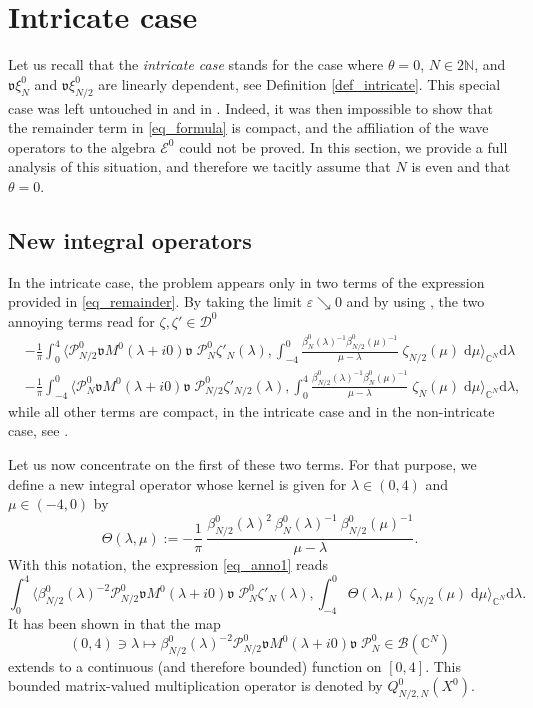 \documentclass[11pt]{article}
\def\B{\mathscr B}
\def\C{\mathbb C}
\def\d{\mathrm d}
\def\Drond{\mathscr D}
\def\EE{\mathscr E}
\def\N{\mathbb N}
\def\P{\mathcal P}
\def\v{\mathfrak v}
\begin{document}
\section{Intricate case}\label{sec_Degenerate}
\setcounter{equation}{0}
Let us recall that the \emph{intricate case} stands for the case where $\theta=0$,
$N\in2\N$, and $\v\xi_N^0$ and $\v\xi^0_{N/2}$ are linearly dependent, 
see Definition \ref{def_intricate}.
This special case was left untouched in \cite{NRT} and in \cite{APRR}.
Indeed, it was then impossible to show that the remainder term in \eqref{eq_formula}
is compact, and the affiliation of the wave operators to the algebra $\EE^0$
could not be proved.
In this section, we provide a full analysis of this situation, and therefore we tacitly assume
that $N$ is even and that $\theta=0$.

\subsection{New integral operators}\label{sec_extra_t}

In the intricate case, the problem appears only in two terms of the expression provided in \eqref{eq_remainder}. By taking the limit $\varepsilon\searrow 0$ and by using \cite[Lem.~4.1]{NRT}, the two annoying terms read for $\zeta,\zeta'\in\Drond^0$
\begin{align}
\label{eq_anno1} & -\frac{1}{\pi}\int_0^4\bigg\langle
\P_{N/2}^0\v M^0(\lambda+i0)\v\;\!\P_{N}^0
\zeta'_{N}(\lambda),\int_{-4}^0\frac{
\beta_{N}^0(\lambda)^{-1}\beta_{N/2}^0(\mu)^{-1}}{\mu-\lambda}\;\!\zeta_{N/2}(\mu)
\;\!\d\mu\bigg\rangle_{\C^N}\d\lambda \\
\label{eq_anno2} & - \frac{1}{\pi}
\int_{-4}^0\bigg\langle
\P_N^0\v M^0(\lambda+i0)\v\;\!\P_{N/2}^0
\zeta'_{N/2}(\lambda),\int_{0}^4\frac{
\beta_{N/2}^0(\lambda)^{-1}\beta_N^0(\mu)^{-1}}{\mu-\lambda}\;\!\zeta_N(\mu)
\;\!\d\mu\bigg\rangle_{\C^N}\d\lambda,
\end{align}
while all other terms are compact, in the intricate case and in the non-intricate case,
see \cite[Prop.~4.8 \& 4.12]{NRT}.

Let us now concentrate on the first of these two terms. For that purpose, we define a new
integral operator whose kernel is given for $\lambda\in (0,4)$ and $\mu \in (-4,0)$ by
$$
\Theta(\lambda,\mu):=-\frac{1}{\pi}\  \frac{\beta^0_{N/2}(\lambda)^2 \ \beta^0_N(\lambda)^{-1} \ \beta^0_{N/2}(\mu)^{-1}}{\mu-\lambda}.
$$
With this notation, the expression \eqref{eq_anno1} reads
$$
\int_0^4\bigg\langle
\beta^0_{N/2}(\lambda)^{-2} \P_{N/2}^0\v M^0(\lambda+i0)\v\;\!\P_{N}^0
\zeta'_{N}(\lambda),\int_{-4}^0\Theta(\lambda,\mu)\;\!\zeta_{N/2}(\mu)
\;\!\d\mu\bigg\rangle_{\C^N}\d\lambda.
$$
It has been shown in \cite[Lem.~4.5]{NRT} that the map
$$
(0,4)\ni \lambda \mapsto  
\beta^0_{N/2}(\lambda)^{-2} \P_{N/2}^0\v M^0(\lambda+i0)\v\;\!\P_{N}^0 \in \B(\C^N)
$$
extends to a continuous (and therefore bounded) function on $[0,4]$.
This bounded matrix-valued multiplication operator is denoted by $Q^0_{N/2,N}(X^0)$.
\end{document}
